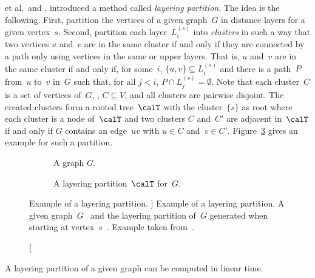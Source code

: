  et al.\,\cite{BranChepDrag1999} and ,  \cite{ChepoiDragan2000} introduced a method called \emph{layering partition}.
The idea is the following.
First, partition the vertices of a given graph~$G$ in distance layers for a given vertex~$s$.
Second, partition each layer~$L_i^{(s)}$ into \emph{clusters} in such a way that two vertices $u$ and~$v$ are in the same cluster if and only if they are connected by a path only using vertices in the same or upper layers.
That is, $u$ and~$v$ are in the same cluster if and only if, for some~$i$, $\{ u, v \} \subseteq L_i^{(s)}$ and there is a path~$P$ from~$u$ to~$v$ in~$G$ such that, for all $j < i$, $P \cap L_j^{(s)} = \emptyset$.
Note that each cluster~$C$ is a set of vertices of~$G$, \ie, $C \subseteq V$, and all clusters are pairwise disjoint.
The created clusters form a rooted tree~$\calT$ with the cluster~$\{ s \}$ as root where each cluster is a node of~$\calT$ and two clusters $C$ and~$C'$ are adjacent in~$\calT$ if and only if $G$ contains an edge~$uv$ with $u \in C$ and~$v \in C'$.
Figure~\ref{fig:LayPartEx} gives an example for such a partition.

\begin{figure}
    [htb]
    \centering

    \begin{subfigure}[b]{0.45\textwidth}
        \centering
        
        \caption
        {%
            A graph $G$.
        }
        \label{fig:LayPartExG}
    \end{subfigure}
    \hfil
    \begin{subfigure}[b]{0.45\textwidth}
        \centering
        
        \caption
        {%
            A layering partition~$\calT$ for~$G$.
        }
        \label{fig:LayPartExL}
    \end{subfigure}%

    \caption
    [%
        Example of a layering partition.
    ]
    {%
        Example of a layering partition.
        A given graph~$G$~ and the layering partition of~$G$ generated when starting at vertex~$s$~.
        Example taken from~\cite{ChepoiDragan2000}.
    }
    \label{fig:LayPartEx}
\end{figure}

\begin{lemma}
    \label{lem:LayPartLinearTime}
A layering partition of a given graph can be computed in linear time.
\end{lemma}


